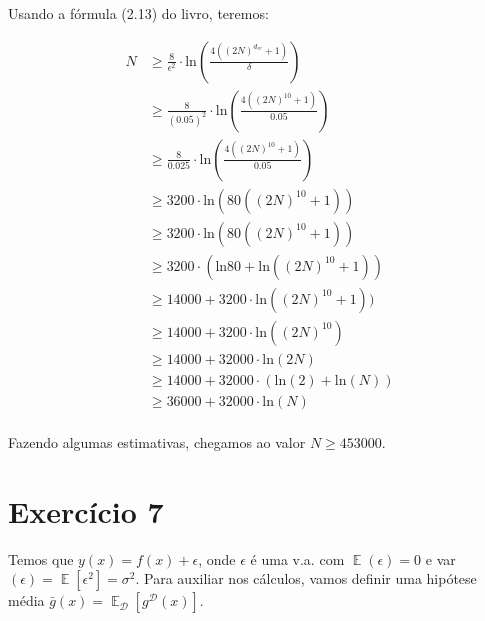 \documentclass[12pt,letterpaper]{article}
\DeclareMathOperator{\expv}{\mathbb{E}}
\DeclareMathOperator{\data}{\mathcal{D}}
\begin{document}
	Usando a fórmula (2.13) do livro, teremos:
	
	\begin{equation*}
		\begin{split}
			N & \geq \frac{8}{\epsilon^2} \cdot\text{ln}\left(\frac{4((2N)^{d_{vc}}+1)}{\delta}\right) \\
			& \geq \frac{8}{(0.05)^2} \cdot\text{ln}\left(\frac{4((2N)^{10}+1)}{0.05}\right) \\
			& \geq \frac{8}{0.025} \cdot\text{ln}\left(\frac{4((2N)^{10}+1)}{0.05}\right) \\
			& \geq 3200 \cdot\text{ln}(80((2N)^{10}+1)) \\
			& \geq 3200 \cdot\text{ln}(80((2N)^{10}+1)) \\
			& \geq 3200\cdot(\text{ln}80 + \text{ln}((2N)^{10}+1)) \\
			& \geq 14000 + 3200 \cdot\text{ln}((2N)^{10}+1))\\
			& \geq 14000 + 3200 \cdot\text{ln}((2N)^{10}) \\
			& \geq 14000 + 32000\cdot\text{ln}(2N) \\
			& \geq 14000 + 32000\cdot(\text{ln}(2) + \text{ln}(N)) \\
			& \geq 36000 + 32000 \cdot \text{ln}(N) \\ 
		\end{split}
	\end{equation*}
	
	Fazendo algumas estimativas, chegamos ao valor $ N \geq 453000 $.
	
	\section*{Exercício 7}
	
	Temos que $ y(x) = f(x) + \epsilon$, onde $ \epsilon $ é uma v.a. com $ \expv(\epsilon) = 0 $ e  var$(\epsilon) = \expv[\epsilon^2] = \sigma^2 $. Para auxiliar nos cálculos, vamos definir uma hipótese média $\bar{g}(x) = \expv_{\data}[g^{\data}(x)]$.
	
\end{document}
